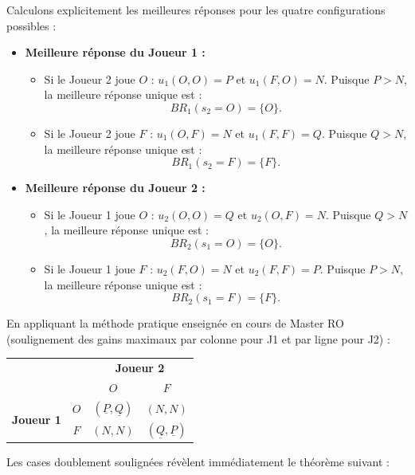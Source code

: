 \documentclass[11pt,a4paper]{article}
\begin{document}
Calculons explicitement les meilleures réponses pour les quatre configurations possibles :
\begin{itemize}[leftmargin=1.5em]
    \item \textbf{Meilleure réponse du Joueur 1 :}
    \begin{itemize}
        \item Si le Joueur 2 joue $O$ : $u_1(O, O) = P$ et $u_1(F, O) = N$. Puisque $P > N$, la meilleure réponse unique est :
        \[
        BR_1(s_2 = O) = \{O\}.
        \]
        \item Si le Joueur 2 joue $F$ : $u_1(O, F) = N$ et $u_1(F, F) = Q$. Puisque $Q > N$, la meilleure réponse unique est :
        \[
        BR_1(s_2 = F) = \{F\}.
        \]
    \end{itemize}
    \item \textbf{Meilleure réponse du Joueur 2 :}
    \begin{itemize}
        \item Si le Joueur 1 joue $O$ : $u_2(O, O) = Q$ et $u_2(O, F) = N$. Puisque $Q > N$, la meilleure réponse unique est :
        \[
        BR_2(s_1 = O) = \{O\}.
        \]
        \item Si le Joueur 1 joue $F$ : $u_2(F, O) = N$ et $u_2(F, F) = P$. Puisque $P > N$, la meilleure réponse unique est :
        \[
        BR_2(s_1 = F) = \{F\}.
        \]
    \end{itemize}
\end{itemize}

En appliquant la méthode pratique enseignée en cours de Master RO (soulignement des gains maximaux par colonne pour J1 et par ligne pour J2) :
\begin{center}
\renewcommand{\arraystretch}{1.4}
\begin{tabular}{cc|cc}
& & \multicolumn{2}{c}{\textbf{Joueur 2}} \\
& & $O$ & $F$ \\ \hline
\multirow{2}{*}{\textbf{Joueur 1}} & $O$ & $(\underline{P}, \underline{Q})$ & $(N, N)$ \\
& $F$ & $(N, N)$ & $(\underline{Q}, \underline{P})$ \\
\end{tabular}
\end{center}

Les cases doublement soulignées révèlent immédiatement le théorème suivant :
\end{document}
